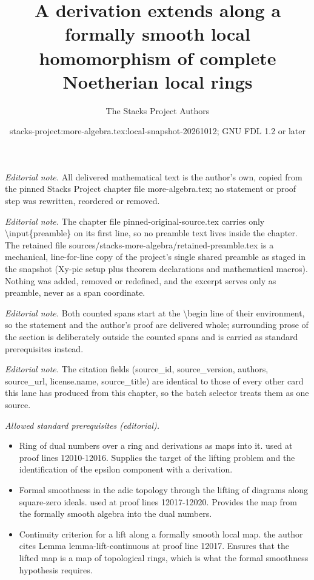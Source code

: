 \documentclass[10pt,a4paper]{amsart}
\title{A derivation extends along a formally smooth local homomorphism of complete Noetherian local rings}
\author{The Stacks Project Authors}
\date{stacks-project:more-algebra.tex:local-snapshot-20261012; GNU FDL 1.2 or later}
\theoremstyle{plain}
\theoremstyle{definition}
\theoremstyle{remark}
\numberwithin{equation}{subsection}
\begin{document}
\maketitle
\setcounter{subsection}{1}
\noindent\textit{Editorial note.} All delivered mathematical text is the author's own, copied from the pinned Stacks Project chapter file more-algebra.tex; no statement or proof step was rewritten, reordered or removed.\par\medskip
\noindent\textit{Editorial note.} The chapter file pinned-original-source.tex carries only \textbackslash{}input\{preamble\} on its first line, so no preamble text lives inside the chapter. The retained file sources/stacks-more-algebra/retained-preamble.tex is a mechanical, line-for-line copy of the project's single shared preamble as staged in the snapshot (Xy-pic setup plus theorem declarations and mathematical macros). Nothing was added, removed or redefined, and the excerpt serves only as preamble, never as a span coordinate.\par\medskip
\noindent\textit{Editorial note.} Both counted spans start at the \textbackslash{}begin line of their environment, so the statement and the author's proof are delivered whole; surrounding prose of the section is deliberately outside the counted spans and is carried as standard prerequisites instead.\par\medskip
\noindent\textit{Editorial note.} The citation fields (source\_id, source\_version, authors, source\_url, license.name, source\_title) are identical to those of every other card this lane has produced from this chapter, so the batch selector treats them as one source.\par\medskip
\noindent\textit{Allowed standard prerequisites (editorial).}\begin{itemize}
\item Ring of dual numbers over a ring and derivations as maps into it. used at proof lines 12010-12016. Supplies the target of the lifting problem and the identification of the epsilon component with a derivation.
\item Formal smoothness in the adic topology through the lifting of diagrams along square-zero ideals. used at proof lines 12017-12020. Provides the map from the formally smooth algebra into the dual numbers.
\item Continuity criterion for a lift along a formally smooth local map. the author cites Lemma lemma-lift-continuous at proof line 12017. Ensures that the lifted map is a map of topological rings, which is what the formal smoothness hypothesis requires.
\end{itemize}\medskip
\end{document}
